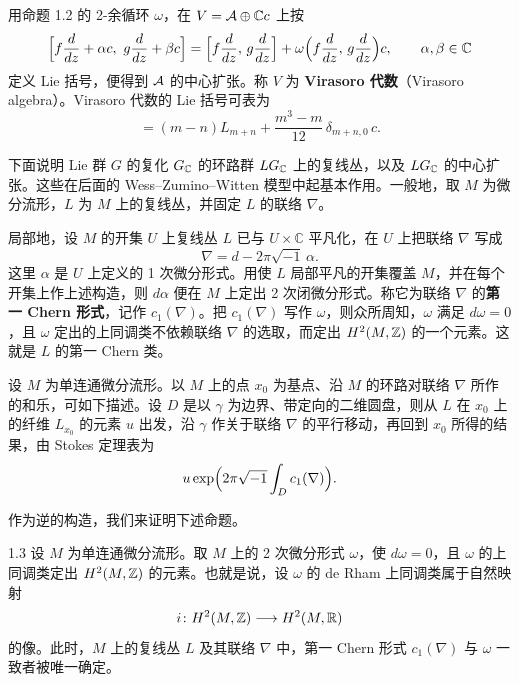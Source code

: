 用命题 1.2 的 2-余循环 $\omega$，在 $V=\mathcal{A}\oplus\mathbb{C}c$ 上按
\[
  \Bigl[f\frac{d}{dz}+\alpha c,\ g\frac{d}{dz}+\beta c\Bigr]
  =\Bigl[f\frac{d}{dz},\,g\frac{d}{dz}\Bigr]
  +\omega\Bigl(f\frac{d}{dz},\,g\frac{d}{dz}\Bigr)c,
  \qquad \alpha,\beta\in\mathbb{C}
\]
定义 Lie 括号，便得到 $\mathcal{A}$ 的中心扩张。称 $V$ 为 \textbf{Virasoro 代数}（Virasoro algebra）。Virasoro 代数的 Lie 括号可表为
\begin{equation}
  [L_{m},L_{n}]=(m-n)L_{m+n}+\frac{m^{3}-m}{12}\,\delta_{m+n,0}\,c. \tag{1.6}
\end{equation}


下面说明 Lie 群 $G$ 的复化 $G_{\mathbb{C}}$ 的环路群 $LG_{\mathbb{C}}$ 上的复线丛，以及 $LG_{\mathbb{C}}$ 的中心扩张。这些在后面的 Wess--Zumino--Witten 模型中起基本作用。一般地，取 $M$ 为微分流形，$L$ 为 $M$ 上的复线丛，并固定 $L$ 的联络 $\nabla$。

局部地，设 $M$ 的开集 $U$ 上复线丛 $L$ 已与 $U\times\mathbb{C}$ 平凡化，在 $U$ 上把联络 $\nabla$ 写成
\[
  \nabla=d-2\pi\sqrt{-1}\,\alpha .
\]
这里 $\alpha$ 是 $U$ 上定义的 1 次微分形式。用使 $L$ 局部平凡的开集覆盖 $M$，并在每个开集上作上述构造，则 $d\alpha$ 便在 $M$ 上定出 2 次闭微分形式。称它为联络 $\nabla$ 的\textbf{第一 Chern 形式}，记作 $c_{1}(\nabla)$。把 $c_{1}(\nabla)$ 写作 $\omega$，则众所周知，$\omega$ 满足 $d\omega=0$，且 $\omega$ 定出的上同调类不依赖联络 $\nabla$ 的选取，而定出 $H^{2}(M,\mathbb{Z})$ 的一个元素。这就是 $L$ 的第一 Chern 类。

设 $M$ 为单连通微分流形。以 $M$ 上的点 $x_{0}$ 为基点、沿 $M$ 的环路对联络 $\nabla$ 所作的和乐，可如下描述。设 $D$ 是以 $\gamma$ 为边界、带定向的二维圆盘，则从 $L$ 在 $x_{0}$ 上的纤维 $L_{x_{0}}$ 的元素 $u$ 出发，沿 $\gamma$ 作关于联络 $\nabla$ 的平行移动，再回到 $x_{0}$ 所得的结果，由 Stokes 定理表为
\[
  u\exp\Bigl(2\pi\sqrt{-1}\int_{D}c_{1}(\nabla)\Bigr).
\]


作为逆的构造，我们来证明下述命题。

\begin{proposition*}{1.3}
  设 $M$ 为单连通微分流形。取 $M$ 上的 2 次微分形式 $\omega$，使 $d\omega=0$，且 $\omega$ 的上同调类定出 $H^{2}(M,\mathbb{Z})$ 的元素。也就是说，设 $\omega$ 的 de Rham 上同调类属于自然映射
  \[
    i\colon H^{2}(M,\mathbb{Z})\longrightarrow H^{2}(M,\mathbb{R})
  \]
  的像。此时，$M$ 上的复线丛 $L$ 及其联络 $\nabla$ 中，第一 Chern 形式 $c_{1}(\nabla)$ 与 $\omega$ 一致者被唯一确定。
\end{proposition*}

